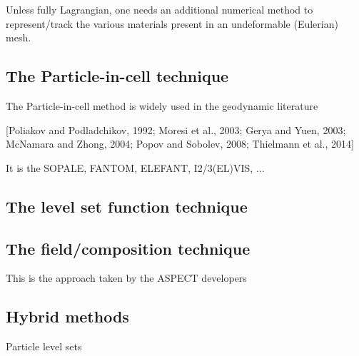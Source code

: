 
Unless fully Lagrangian, one needs an additional numerical method to represent/track
the various materials present in an undeformable (Eulerian) mesh.


\subsection{The Particle-in-cell technique}

\cite{galh19}

The Particle-in-cell method is widely used in the geodynamic literature \cite[e.g.][]{popo92}

 [Poliakov and Podladchikov, 1992; Moresi et al., 2003; Gerya and Yuen, 2003; McNamara and
Zhong, 2004; Popov and Sobolev, 2008; Thielmann et al., 2014]

It is the SOPALE, FANTOM, ELEFANT, I2/3(EL)VIS, ...

\subsection{The level set function technique}


\subsection{The field/composition technique}

This is the approach taken by the ASPECT developers \cite{krhb12,hedg17}


\subsection{Hybrid methods}

Particle level sets \cite{brtf08}




